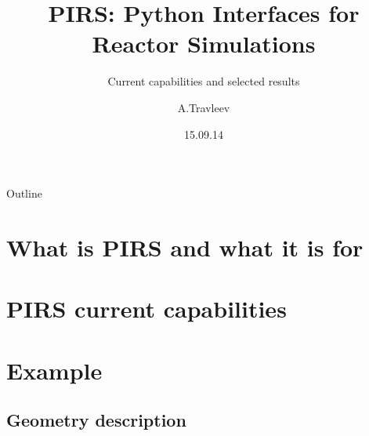 \documentclass[t]{beamer}
\date{15.09.14}
\title[HPMC final meeting]{PIRS: Python Interfaces for Reactor Simulations}
\subtitle{Current capabilities and selected results}
\author{A.Travleev}
\institute{Institute for Neutron Physics and Reactor Technology}
\begin{document}
\begin{frame}
  \maketitle
\end{frame}

\begin{frame}{Outline}
    \tableofcontents
\end{frame}


\section{What is PIRS and what it is for}


% 
%

%

\section{PIRS current capabilities}



\section{Example}
\subsection{Geometry description}

\end{document}
